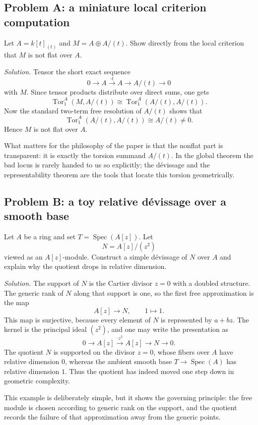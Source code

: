 \documentclass[11pt,oneside]{article}
\newcommand{\Spec}{\operatorname{Spec}}
\newcommand{\Tor}{\operatorname{Tor}}
\begin{document}
\subsection*{Problem A: a miniature local criterion computation}

Let $A=k[t]_{(t)}$ and $M=A\oplus A/(t)$.  Show directly from the local criterion that $M$ is not flat over $A$.

\emph{Solution.}  Tensor the short exact sequence
\[
0\to A\xrightarrow{\cdot t} A\to A/(t)\to 0
\]
with $M$.  Since tensor products distribute over direct sums, one gets
\[
\Tor_1^A(M,A/(t))\cong \Tor_1^A(A/(t),A/(t)).
\]
Now the standard two-term free resolution of $A/(t)$ shows that
\[
\Tor_1^A(A/(t),A/(t))\cong A/(t)\neq 0.
\]
Hence $M$ is not flat over $A$.

What matters for the philosophy of the paper is that the nonflat part is transparent: it is exactly the torsion summand $A/(t)$.  In the global theorem the bad locus is rarely handed to us so explicitly; the d\'evissage and the representability theorem are the tools that locate this torsion geometrically.

\subsection*{Problem B: a toy relative d\'evissage over a smooth base}

Let $A$ be a ring and set $T=\Spec(A[z])$.  Let
\[
N=A[z]/(z^2)
\]
viewed as an $A[z]$-module.  Construct a simple d\'evissage of $N$ over $A$ and explain why the quotient drops in relative dimension.

\emph{Solution.}  The support of $N$ is the Cartier divisor $z=0$ with a doubled structure.  The generic rank of $N$ along that support is one, so the first free approximation is the map
\[
A[z]\longrightarrow N,
\qquad 1\longmapsto 1.
\]
This map is surjective, because every element of $N$ is represented by $a+bz$.  The kernel is the principal ideal $(z^2)$, and one may write the presentation as
\[
0\to A[z]\xrightarrow{\cdot z^2} A[z]\to N\to 0.
\]
The quotient $N$ is supported on the divisor $z=0$, whose fibers over $A$ have relative dimension $0$, whereas the ambient smooth base $T\to \Spec(A)$ has relative dimension $1$.  Thus the quotient has indeed moved one step down in geometric complexity.

This example is deliberately simple, but it shows the governing principle: the free module is chosen according to generic rank on the support, and the quotient records the failure of that approximation away from the generic points.
\end{document}
